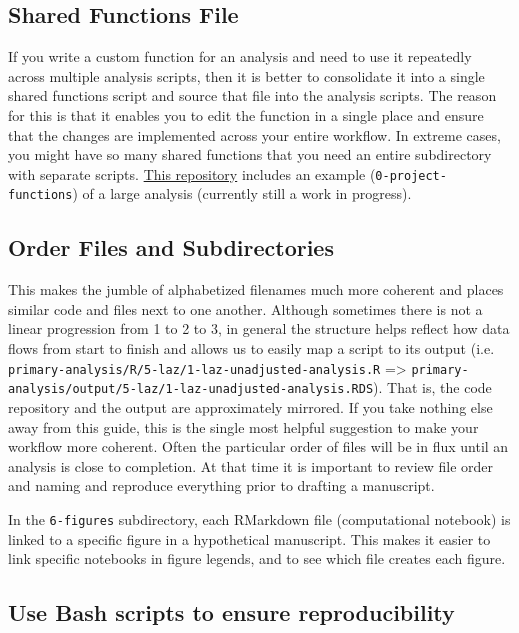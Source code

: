 \documentclass[]{book}
\begin{document}
\hypertarget{shared-functions-file}{%
\subsection{Shared Functions File}\label{shared-functions-file}}

If you write a custom function for an analysis and need to use it repeatedly across multiple analysis scripts, then it is better to consolidate it into a single shared functions script and source that file into the analysis scripts. The reason for this is that it enables you to edit the function in a single place and ensure that the changes are implemented across your entire workflow. In extreme cases, you might have so many shared functions that you need an entire subdirectory with separate scripts. \href{https://github.com/HBGD-UCB/ki-longitudinal-manuscripts/}{This repository} includes an example (\texttt{0-project-functions}) of a large analysis (currently still a work in progress).

\hypertarget{order-files-and-subdirectories}{%
\subsection{Order Files and Subdirectories}\label{order-files-and-subdirectories}}

This makes the jumble of alphabetized filenames much more coherent and places similar code and files next to one another. Although sometimes there is not a linear progression from 1 to 2 to 3, in general the structure helps reflect how data flows from start to finish and allows us to easily map a script to its output (i.e. \texttt{primary-analysis/R/5-laz/1-laz-unadjusted-analysis.R} =\textgreater{} \texttt{primary-analysis/output/5-laz/1-laz-unadjusted-analysis.RDS}). That is, the code repository and the output are approximately mirrored. If you take nothing else away from this guide, this is the single most helpful suggestion to make your workflow more coherent. Often the particular order of files will be in flux until an analysis is close to completion. At that time it is important to review file order and naming and reproduce everything prior to drafting a manuscript.

In the \texttt{6-figures} subdirectory, each RMarkdown file (computational notebook) is linked to a specific figure in a hypothetical manuscript. This makes it easier to link specific notebooks in figure legends, and to see which file creates each figure.

\hypertarget{use-bash-scripts-to-ensure-reproducibility}{%
\subsection{Use Bash scripts to ensure reproducibility}\label{use-bash-scripts-to-ensure-reproducibility}}
\end{document}

